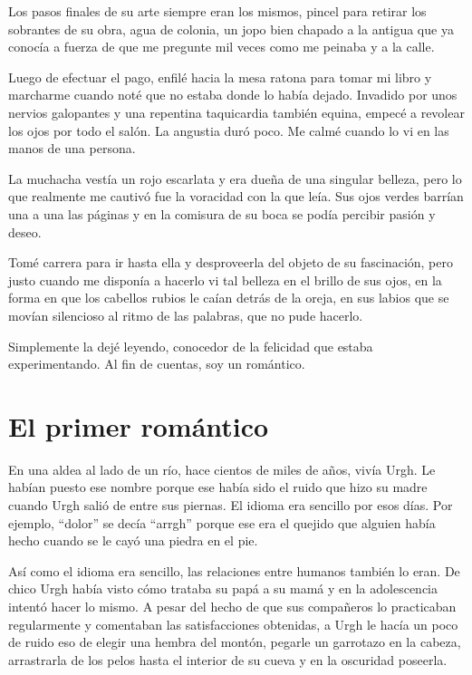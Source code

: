 \documentclass[11pt,twoside,openright,a6paper]{book}
\begin{document}
Los pasos finales de su arte siempre eran los mismos, pincel para retirar los sobrantes de su obra, agua de colonia, un jopo bien chapado a la antigua que ya conocía a fuerza de que me pregunte mil veces como me peinaba y a la calle.

Luego de efectuar el pago, enfilé hacia la mesa ratona para tomar mi libro y marcharme cuando noté que no estaba donde lo había dejado. Invadido por unos nervios galopantes y una repentina taquicardia también equina, empecé a revolear los ojos por todo el salón. La angustia duró poco. Me calmé cuando lo vi en las manos de una persona.

La muchacha vestía un rojo escarlata y era dueña de una singular belleza, pero lo que realmente me cautivó fue la voracidad con la que leía. Sus ojos verdes barrían una a una las páginas y en la comisura de su boca se podía percibir pasión y deseo.

Tomé carrera para ir hasta ella y desproveerla del objeto de su fascinación, pero justo cuando me disponía a hacerlo vi tal belleza en el brillo de sus ojos, en la forma en que los cabellos rubios le caían detrás de la oreja, en sus labios que se movían silencioso al ritmo de las palabras, que no pude hacerlo.

Simplemente la dejé leyendo, conocedor de la felicidad que estaba experimentando. Al fin de cuentas, soy un romántico.

\chapter*{El primer romántico}

En una aldea al lado de un río, hace cientos de miles de años, vivía Urgh. Le habían puesto ese nombre porque ese había sido el ruido que hizo su madre cuando Urgh salió de entre sus piernas. El idioma era sencillo por esos días. Por ejemplo, “dolor” se decía “arrgh” porque ese era el quejido que alguien había hecho cuando se le cayó una piedra en el pie.

Así como el idioma era sencillo, las relaciones entre humanos también lo eran. De chico Urgh había visto cómo trataba su papá a su mamá y en la adolescencia intentó hacer lo mismo. A pesar del hecho de que sus compañeros lo practicaban regularmente y comentaban las satisfacciones obtenidas, a Urgh le hacía un poco de ruido eso de elegir una hembra del montón, pegarle un garrotazo en la cabeza, arrastrarla de los pelos hasta el interior de su cueva y en la oscuridad poseerla.
\end{document}
